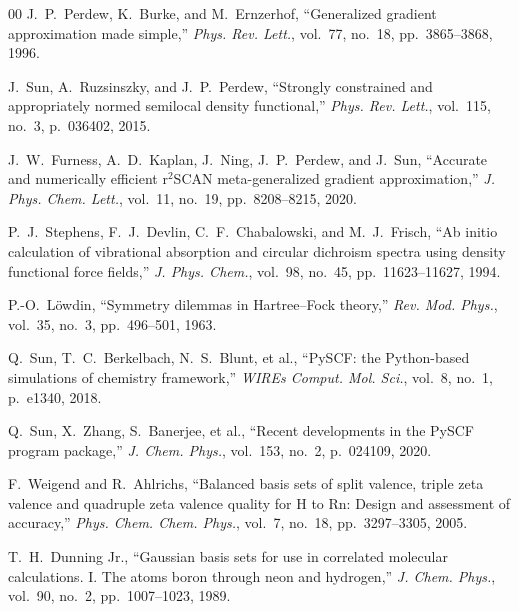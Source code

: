 \documentclass[journal]{IEEEtran}
\begin{document}
\begin{thebibliography}{00}
J.~P.~Perdew, K.~Burke, and M.~Ernzerhof, ``Generalized gradient approximation made simple,'' \textit{Phys. Rev. Lett.}, vol.~77, no.~18, pp.~3865--3868, 1996.

J.~Sun, A.~Ruzsinszky, and J.~P.~Perdew, ``Strongly constrained and appropriately normed semilocal density functional,'' \textit{Phys. Rev. Lett.}, vol.~115, no.~3, p.~036402, 2015.

J.~W.~Furness, A.~D.~Kaplan, J.~Ning, J.~P.~Perdew, and J.~Sun, ``Accurate and numerically efficient r$^2$SCAN meta-generalized gradient approximation,'' \textit{J. Phys. Chem. Lett.}, vol.~11, no.~19, pp.~8208--8215, 2020.

P.~J.~Stephens, F.~J.~Devlin, C.~F.~Chabalowski, and M.~J.~Frisch, ``Ab initio calculation of vibrational absorption and circular dichroism spectra using density functional force fields,'' \textit{J. Phys. Chem.}, vol.~98, no.~45, pp.~11623--11627, 1994.

P.-O.~L\"owdin, ``Symmetry dilemmas in Hartree--Fock theory,'' \textit{Rev. Mod. Phys.}, vol.~35, no.~3, pp.~496--501, 1963.

Q.~Sun, T.~C.~Berkelbach, N.~S.~Blunt, et al., ``PySCF: the Python-based simulations of chemistry framework,'' \textit{WIREs Comput. Mol. Sci.}, vol.~8, no.~1, p.~e1340, 2018.

Q.~Sun, X.~Zhang, S.~Banerjee, et al., ``Recent developments in the PySCF program package,'' \textit{J. Chem. Phys.}, vol.~153, no.~2, p.~024109, 2020.

F.~Weigend and R.~Ahlrichs, ``Balanced basis sets of split valence, triple zeta valence and quadruple zeta valence quality for H to Rn: Design and assessment of accuracy,'' \textit{Phys. Chem. Chem. Phys.}, vol.~7, no.~18, pp.~3297--3305, 2005.

T.~H.~Dunning Jr., ``Gaussian basis sets for use in correlated molecular calculations. I. The atoms boron through neon and hydrogen,'' \textit{J. Chem. Phys.}, vol.~90, no.~2, pp.~1007--1023, 1989.
\end{thebibliography}
\end{document}
